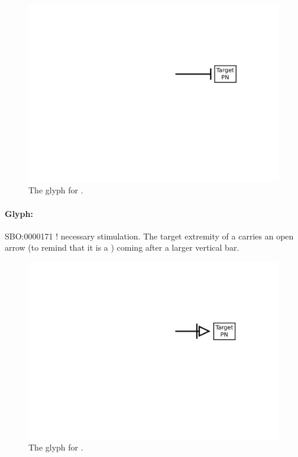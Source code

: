 \begin{figure}[htb]
  \centering
  \includegraphics[scale = 0.5]{images/inhibition}
  \caption{The \PD glyph for .}
  \label{fig:techref:inhibition}
\end{figure}


\paragraph{Glyph: }\label{sec:techref:necessary_stim}


\begin{glyphDescription}
 \glyphSboTerm SBO:0000171 ! necessary stimulation.
 \glyphNode The target extremity of a  carries an open arrow (to remind that it is a ) coming after a larger vertical bar.
 \end{glyphDescription}

\begin{figure}[htb]
  \centering
  \includegraphics[scale = 0.5]{images/necessary_stim}
  \caption{The \PD glyph for .}
  \label{fig:techref:Necessary Stimulation}
\end{figure}

